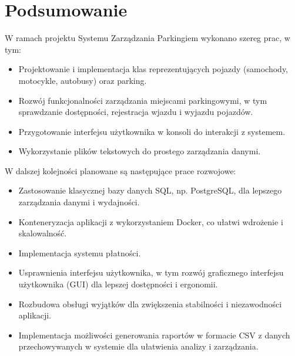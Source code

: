 \chapter{Podsumowanie}
W ramach projektu Systemu Zarządzania Parkingiem wykonano szereg prac, w tym:
\begin{itemize}
    \item Projektowanie i implementacja klas reprezentujących pojazdy (samochody, motocykle, autobusy) oraz parking.
    \item Rozwój funkcjonalności zarządzania miejscami parkingowymi, w tym sprawdzanie dostępności, rejestracja wjazdu i wyjazdu pojazdów.
    \item Przygotowanie interfejsu użytkownika w konsoli do interakcji z systemem.
    \item Wykorzystanie plików tekstowych do prostego zarządzania danymi.
\end{itemize}

W dalszej kolejności planowane są następujące prace rozwojowe:
\begin{itemize}
    \item Zastosowanie klasycznej bazy danych SQL, np. PostgreSQL, dla lepszego zarządzania danymi i wydajności.
    \item Konteneryzacja aplikacji z wykorzystaniem Docker, co ułatwi wdrożenie i skalowalność.
    \item Implementacja systemu płatności.
    \item Usprawnienia interfejsu użytkownika, w tym rozwój graficznego interfejsu użytkownika (GUI) dla lepszej dostępności i ergonomii.
    \item Rozbudowa obsługi wyjątków dla zwiększenia stabilności i niezawodności aplikacji.
    \item Implementacja możliwości generowania raportów w formacie CSV z danych przechowywanych w systemie dla ułatwienia analizy i zarządzania.
\end{itemize}
